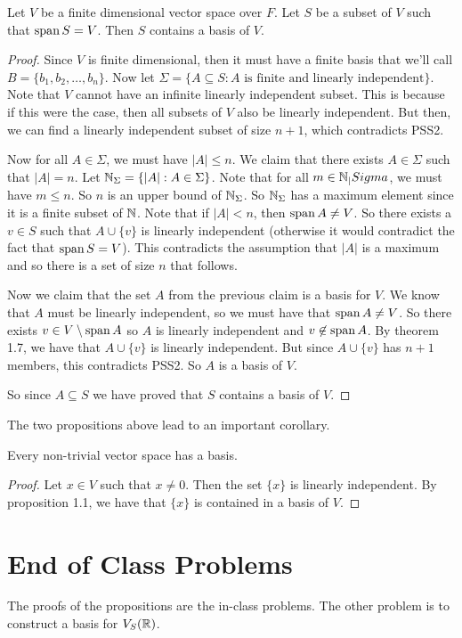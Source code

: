 \documentclass[main.tex]{subfiles}
\begin{document}
    \begin{prop}{}{}
        Let $V$ be a finite dimensional vector space over $F$. Let $S$ be a subset of $V$ such that $\operatorname{span} S = V$. Then $S$ contains a basis of $V$. 
    \end{prop}
    \begin{proof}
        Since $V$ is finite dimensional, then it must have a finite basis that we'll call $B = \{b_1, b_2, \dots, b_n\}$. Now let $\Sigma = \{A \subseteq S : A \text{ is finite and linearly independent}\}$. Note that $V$ cannot have an infinite linearly independent subset. This is because if this were the case, then all subsets of $V$ also be linearly independent. But then, we can find a linearly independent subset of size $n+1$, which contradicts PSS2. \par 
        
        Now for all $A\in \Sigma$, we must have $|A| \leq n$. We claim that there exists $A\in \Sigma$ such that $|A| = n$. Let $\mathbb{N}_\Sigma = \{|A| : A \in \Sigma\}$. Note that for all $m\in \mathbb{N}_|Sigma$, we must have $m\leq n$. So $n$ is an upper bound of $\mathbb{N}_\Sigma$. So $\mathbb{N}_\Sigma$ has a maximum element since it is a finite subset of $\mathbb{N}$. Note that if $|A| < n$, then $\operatorname{span} A \neq V$. So there exists a $v\in S$ such that $A\cup \{v\}$ is linearly independent (otherwise it would contradict the fact that $\operatorname{span} S = V$). This contradicts the assumption that $|A|$ is a maximum and so there is a set of size $n$ that follows. \par 
        
        Now we claim that the set $A$ from the previous claim is a basis for $V$. We know that $A$ must be linearly independent, so we must have that $\operatorname{span} A \neq V$. So there exists $v\in V\setminus \operatorname{span} A$ so $A$ is linearly independent and $v\not\in \operatorname{span} A$. By theorem 1.7, we have that $A\cup \{v\}$ is linearly independent. But since $A\cup \{v\}$ has $n+1$ members, this contradicts PSS2. So $A$ is a basis of $V$. \par 
        
        So since $A\subseteq S$ we have proved that $S$ contains a basis of $V$.
    \end{proof}
    The two propositions above lead to an important corollary. 

    \begin{cor}{}{}
        Every non-trivial vector space has a basis.
    \end{cor}
    \begin{proof}
        Let $x\in V$ such that $x \neq 0$. Then the set $\{x\}$ is linearly independent. By proposition 1.1, we have that $\{x\}$ is contained in a basis of $V$.
    \end{proof}

    \section{End of Class Problems}
    The proofs of the propositions are the in-class problems. The other problem is to construct a basis for $V_S(\mathbb{R})$.
\end{document}

